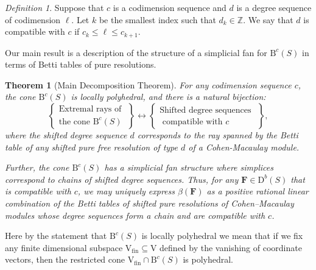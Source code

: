 \documentclass[12pt]{amsart}
\newtheorem{thm}[lemma]{Theorem}
\theoremstyle{definition}
\theoremstyle{remark}
\newtheorem{defn}[lemma]{Definition}
\newcommand{\ZZ}{\mathbb{Z}}
\newcommand{\VV}{\mathrm{V}}
\newcommand{\cc}{c}
\newcommand{\dd}{d}
\newcommand{\FF}{\mathbf{F}}
\newcommand{\defi}[1]{\textsf{#1}} %
\newcommand{\DD}{\mathrm{D}}
\newcommand{\BBQ}{\mathrm{B}}
\begin{document}
\begin{defn}\label{defn:deg compatible}
Suppose that $\cc$ is a codimension sequence  and $\dd$ is a degree sequence  of codimension $\ell$. Let $k$ be the smallest index
such that $d_{k}\in \ZZ$. We say that $\dd$ is \defi{compatible with $\cc$} if $\cc_k\leq \ell\leq \cc_{k+1}$.
\end{defn}



Our main result is a description of the structure of a simplicial fan for $\BBQ^{\cc}(S)$ in terms of  Betti tables of pure resolutions.  

\begin{thm}[Main Decomposition Theorem]\label{thm:extremal rays refined}
For any codimension sequence $\cc$, the cone $\BBQ^{\cc}(S)$ is locally polyhedral, and there is a natural bijection:
\[
\left\{
\begin{matrix}
\text{Extremal rays of }\\
\text{the cone } \BBQ^{\cc}(S)
\end{matrix}
\right\}
\longleftrightarrow
\left\{
\begin{matrix}
\text{Shifted degree sequences }\\
\text{ compatible with $\cc$}
\end{matrix}
\right\},
\]
where the shifted degree sequence $\dd$ corresponds to the ray spanned by 
the Betti table of any shifted pure free resolution of type $\dd$ of a Cohen-Macaulay module. 

Further, the cone $\BBQ^{\cc}(S)$ has a simplicial fan structure where simplices correspond to chains of shifted degree sequences.  Thus, for any $\FF\in \DD^b(S)$ that is compatible with $\cc$, we may uniquely express $\beta(\FF)$ as a positive rational linear combination of the Betti tables of shifted pure resolutions of Cohen--Macaulay modules whose degree sequences form a chain and are compatible with $\cc$.
\end{thm}

Here by the statement that $\BBQ^{\cc}(S)$ is \defi{locally polyhedral} we mean that if we fix any finite dimensional subspace $\VV_{\text{fin}}\subseteq \VV$ defined by the vanishing of coordinate vectors, then the restricted cone $\VV_{\text{fin}}\cap \BBQ^{\cc}(S)$ is polyhedral. 
\end{document}
